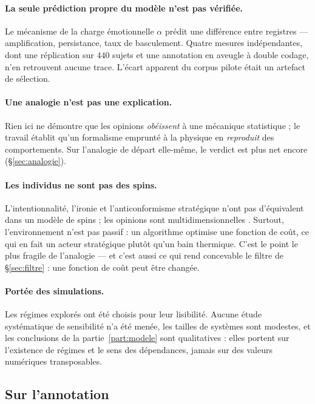 \documentclass[11pt,a4paper]{article}
\begin{document}
\paragraph{La seule prédiction propre du modèle n'est pas vérifiée.} Le mécanisme de la charge
émotionnelle $\alpha$ prédit une différence entre registres --- amplification, persistance,
taux de basculement. Quatre mesures indépendantes, dont une réplication sur $440$ sujets et une
annotation en aveugle à double codage, n'en retrouvent aucune trace. L'écart apparent du
corpus pilote était un artefact de sélection.

\paragraph{Une analogie n'est pas une explication.} Rien ici ne démontre que les opinions
\emph{obéissent} à une mécanique statistique ; le travail établit qu'un formalisme emprunté à
la physique en \emph{reproduit} des comportements. Sur l'analogie de départ elle-même, le
verdict est plus net encore (\S\ref{sec:analogie}).

\paragraph{Les individus ne sont pas des spins.} L'intentionnalité, l'ironie et
l'anticonformisme stratégique n'ont pas d'équivalent dans un modèle de spins ; les opinions
sont multidimensionnelles \citep{deffuant2000}. Surtout, l'environnement n'est pas passif : un
algorithme optimise une fonction de coût, ce qui en fait un acteur stratégique plutôt qu'un
bain thermique. C'est le point le plus fragile de l'analogie --- et c'est aussi ce qui rend
concevable le filtre de \S\ref{sec:filtre} : une fonction de coût peut être changée.

\paragraph{Portée des simulations.} Les régimes explorés ont été choisis pour leur lisibilité.
Aucune étude systématique de sensibilité n'a été menée, les tailles de systèmes sont modestes,
et les conclusions de la partie~\ref{part:modele} sont qualitatives : elles portent sur
l'existence de régimes et le sens des dépendances, jamais sur des valeurs numériques
transposables.

\subsection{Sur l'annotation}
\end{document}
